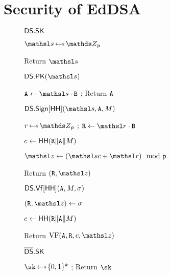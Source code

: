 \section{Security of EdDSA} \label{sec-schemes}



\begin{figure}[t]
{
  \begin{algorithm-initial}{$\mathsf{DS}.\mathsf{SK}$}
  \item $\s \getsr \Z_{\Prime}$ %
  \item Return $\s$
  \end{algorithm-initial}
  
\begin{algorithm-subsequent}{$\DS.\MakePK(\s)$}
  \item  $\curvepoint{A} \gets \s\cdot \generatorEDSA$
  ; Return $\mathtt{A}$
\end{algorithm-subsequent}

\begin{algorithm-subsequent}{$\DS.\Sign[\HH](\s, \curvepoint{A}, \msg)$}
\item $r \getsr \Z_{\Prime}$ ; $\curvepoint{R} \gets \littler\cdot \generatorEDSA$
\item $c \gets \mathsf{HH}(\mathtt{R}\|\mathtt{A}\| {M})$
\item $\z \gets (\s c + \littler) \mod \Prime$
\item Return $(\curvepoint{R}, \z)$
  \end{algorithm-subsequent}
  \begin{algorithm-subsequent}{$\mathsf{DS}.\mathsf{Vf}[\mathsf{HH}](\mathtt{A}, {M}, \sigma)$}
  \item $(\curvepoint{R}, \z) \gets \sigma$
  \item  $c \gets \mathsf{HH}(\mathtt{R}\|\mathtt{A}\| {M})$
  \item Return $\VF(\curvepoint{A},\curvepoint{R},c,\z)$
  \end{algorithm-subsequent}  \vspace{2pt}
 }
{
\begin{algorithm-initial}{$\overline{\mathsf{DS}}.\mathsf{SK}$}
		\item $\sk \getsr \bits^k$
		; Return $\sk$
\end{algorithm-initial}	
		
}
\end{figure}
